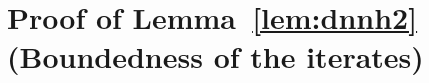 \documentclass[twoside]{article}
\begin{document}
%



\vspace{0.2in}

\section{Proof of Lemma~\ref{lem:dnnh2} (Boundedness of the iterates)}\label{app:lemdnnh2}
\end{document}
